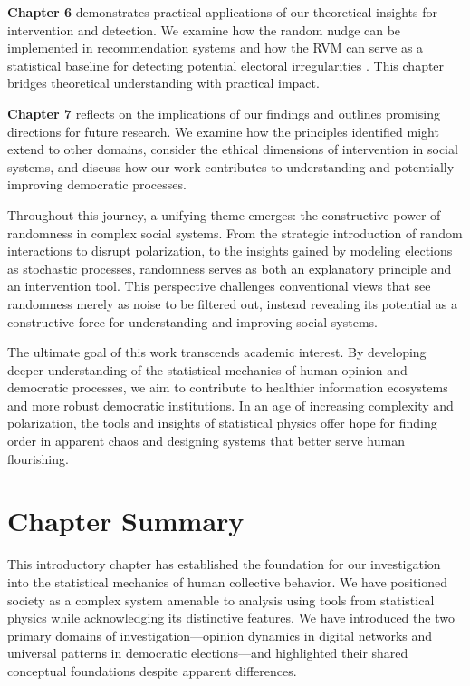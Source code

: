 \textbf{Chapter 6} demonstrates practical applications of our theoretical insights for intervention and detection. We examine how the random nudge can be implemented in recommendation systems and how the RVM can serve as a statistical baseline for detecting potential electoral irregularities \cite{statistical-detection-of-systematic-election-irregularities, brigaldino2011elections, belarus2012parliamentary, belarusian2019parliamentary, belarus2020presidential}. This chapter bridges theoretical understanding with practical impact.

\textbf{Chapter 7} reflects on the implications of our findings and outlines promising directions for future research. We examine how the principles identified might extend to other domains, consider the ethical dimensions of intervention in social systems, and discuss how our work contributes to understanding and potentially improving democratic processes.

Throughout this journey, a unifying theme emerges: the constructive power of randomness in complex social systems. From the strategic introduction of random interactions to disrupt polarization, to the insights gained by modeling elections as stochastic processes, randomness serves as both an explanatory principle and an intervention tool. This perspective challenges conventional views that see randomness merely as noise to be filtered out, instead revealing its potential as a constructive force for understanding and improving social systems.

The ultimate goal of this work transcends academic interest. By developing deeper understanding of the statistical mechanics of human opinion and democratic processes, we aim to contribute to healthier information ecosystems and more robust democratic institutions. In an age of increasing complexity and polarization, the tools and insights of statistical physics offer hope for finding order in apparent chaos and designing systems that better serve human flourishing.

\section{Chapter Summary}

This introductory chapter has established the foundation for our investigation into the statistical mechanics of human collective behavior. We have positioned society as a complex system amenable to analysis using tools from statistical physics while acknowledging its distinctive features. We have introduced the two primary domains of investigation—opinion dynamics in digital networks and universal patterns in democratic elections—and highlighted their shared conceptual foundations despite apparent differences. 

